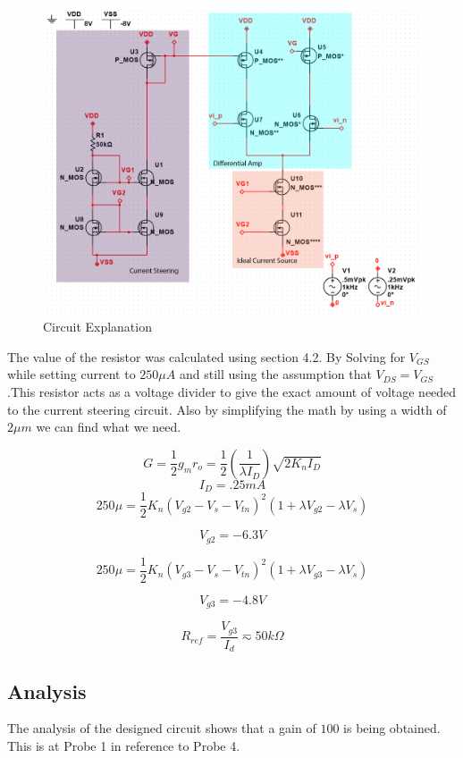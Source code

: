 \documentclass[12pt]{article}
\begin{document}
\begin{figure}[h]
	\label{fig:amp}
	\caption{Circuit Explanation}
	\centering
	\includegraphics[width=.8\textwidth]{photoshop}
\end{figure}

The value of the resistor was calculated using section 4.2. By Solving for $V_{GS}$ while setting current to $250\mu A$ and still using the assumption that $V_{DS} = V_{GS}$.This resistor acts as a voltage divider to give the exact amount of voltage needed to the current steering circuit. Also by simplifying the math by using a width of $2\mu m$ we can find what we need.\

$$G = \frac{1}{2} g_m r_o = \frac{1}{2} (\frac{1}{\lambda I_D}) \sqrt{2K_n I_D}$$
$$I_D = .25mA$$
$$250\mu = \frac{1}{2}  K_n (V_{g2} - V_s - V_{tn} )^2(1 + \lambda V_{g2} -\lambda V_s)    $$

$$V_{g2} = -6.3V$$

$$250\mu = \frac{1}{2}  K_n (V_{g3} - V_s - V_{tn} )^2(1 + \lambda V_{g3} -\lambda V_s)    $$

$$V_{g3} = -4.8V$$

$$R_{ref} = \frac{V_{g3} }{I_d}\eqsim 50k\Omega$$



\subsection{Analysis}
The analysis of the designed circuit shows that a gain of $100$ is being obtained. This is at Probe 1 in reference to Probe 4.
\end{document}
